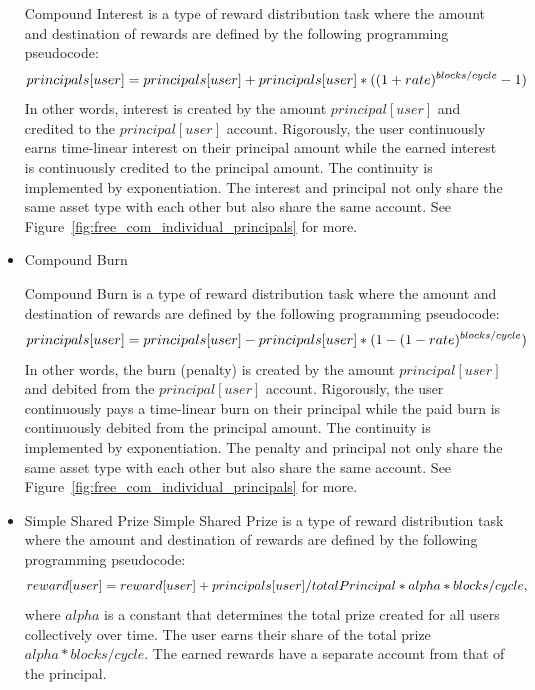 \documentclass{article}
\begin{document}
\begin{itemize}
  \label{sec:CompoundInterest}
  Compound Interest is a type of reward distribution task where the amount 
  and destination of rewards are defined by the following programming pseudocode:
  \begin{equation}  \label{eq:CompoundInterest}
  \\principals[user] = principals[user] + principals[user] * ((1+rate)^{blocks/cycle}-1)
  \end{equation}
  In other words, interest is created by the amount $principal[user]$ and credited   
  to the $principal[user]$ account.
  Rigorously,
  the user continuously earns time-linear interest on their principal amount 
  while the earned interest is continuously credited to the principal amount. 
  The continuity is implemented by exponentiation.
  The interest and principal 
  not only share the same asset type with each other but also share the same account.
  See Figure~\ref{fig:free_com_individual_principals} for more.

  \item Compound Burn
  \label{sec:CompoundBurn}

  Compound Burn is a type of reward distribution task where the amount 
  and destination of rewards are defined by the following programming pseudocode:
  \begin{equation}  \label{eq:CompoundBurn}
  \\principals[user] = principals[user] - principals[user] * (1-(1-rate)^{blocks/cycle})
  \end{equation}
  In other words, the burn (penalty) is created by the amount $principal[user]$ and debited  
  from the $principal[user]$ account.
  Rigorously, 
  the user continuously pays a time-linear burn on their principal 
  while the paid burn is continuously debited from the principal amount. 
  The continuity is implemented by exponentiation.
  The penalty and principal 
  not only share the same asset type with each other but also share the same account.
  See Figure~\ref{fig:free_com_individual_principals} for more.

  \item Simple Shared Prize \newline
  \label{sec:SimpleSharedPrize}
  Simple Shared Prize is a type of reward distribution task where the amount 
  and destination of rewards are defined by the following programming pseudocode:
  \begin{equation}  \label{eq:SimpleSharedPrize}
    \\reward[user] = reward[user] + principals[user] / totalPrincipal *  alpha  * blocks / cycle,
  \end{equation}
  where $alpha$ is a constant that determines the total prize created for all users 
  collectively over time.
  The user earns their share of the total prize 
  $alpha  * blocks / cycle$. The earned rewards have a separate account 
  from that of the principal.
\end{itemize}
\end{document}
